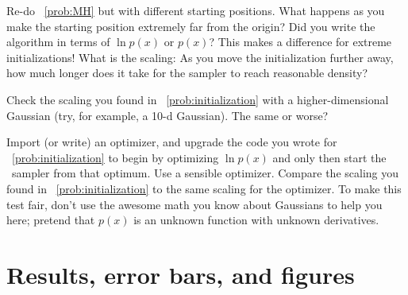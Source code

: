 \documentclass[12pt,twoside,pdftex]{article}
\newcommand{\MCMC}{\acronym{MCMC}}
\begin{document}
\begin{problem}\label{prob:initialization}
Re-do \problemname~\ref{prob:MH} but with different starting
positions.
What happens as you make the starting position extremely far from the
origin?
Did you write the algorithm in terms of $\ln p(x)$ or $p(x)$?
This makes a difference for extreme initializations!
What is the scaling:  As you move the initialization further away,
how much longer does it take for the sampler to reach reasonable
density?
\end{problem}

\begin{problem}
Check the scaling you found in \problemname~\ref{prob:initialization}
with a higher-dimensional Gaussian (try, for example, a 10-d Gaussian).
The same or worse?
\end{problem}

\begin{problem}
Import (or write) an optimizer, and upgrade the code you wrote for
\problemname~\ref{prob:initialization} to begin by optimizing $\ln
p(x)$ and only then start the \MCMC\ sampler from that optimum.
Use a sensible optimizer.
Compare the scaling you found in
\problemname~\ref{prob:initialization} to the same scaling for the
optimizer.
To make this test fair, don't use the awesome math you know about
Gaussians to help you here; pretend that $p(x)$ is an unknown function
with unknown derivatives.
\end{problem}

\section{Results, error bars, and figures}\label{sec:results}
\end{document}
